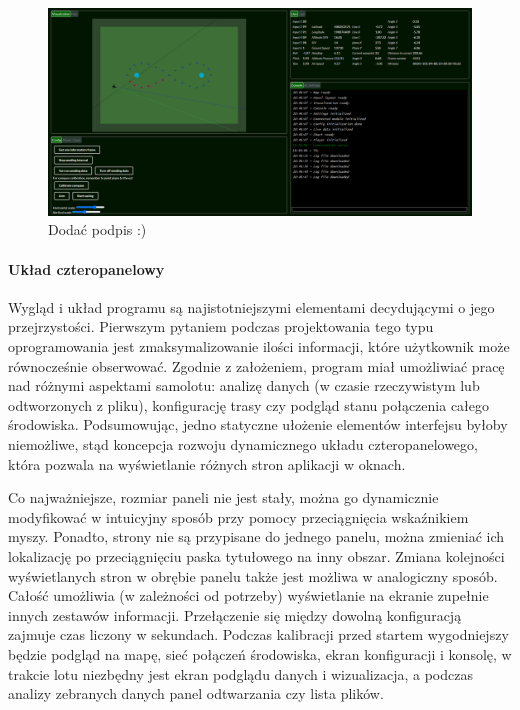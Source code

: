\documentclass[12pt, a4paper]{article}
\begin{document}
 \begin{figure}[ht]
    \centering
    \includegraphics[width=1\textwidth]{weball}
    \caption{Dodać podpis :)}
\end{figure}



\paragraph{Układ czteropanelowy}\mbox{}

Wygląd i układ programu są najistotniejszymi elementami decydującymi o jego przejrzystości. Pierwszym pytaniem podczas projektowania tego typu oprogramowania jest zmaksymalizowanie ilości informacji, które użytkownik może równocześnie obserwować. Zgodnie z założeniem, program  miał umożliwiać pracę nad różnymi aspektami samolotu: analizę danych (w czasie rzeczywistym lub odtworzonych z pliku), konfigurację trasy czy podgląd stanu połączenia całego środowiska. Podsumowując, jedno statyczne ułożenie elementów interfejsu byłoby niemożliwe, stąd koncepcja rozwoju dynamicznego układu czteropanelowego, która pozwala na wyświetlanie różnych stron aplikacji w oknach.

Co najważniejsze, rozmiar paneli nie jest stały, można go dynamicznie modyfikować w intuicyjny sposób przy pomocy przeciągnięcia wskaźnikiem myszy. Ponadto, strony nie są przypisane do jednego panelu, można zmieniać ich lokalizację po przeciągnięciu paska tytułowego na inny obszar. Zmiana kolejności wyświetlanych stron w obrębie panelu także jest możliwa w analogiczny sposób. Całość umożliwia (w zależności od potrzeby) wyświetlanie na ekranie zupełnie innych zestawów informacji. Przełączenie się między dowolną konfiguracją zajmuje czas liczony w sekundach. Podczas kalibracji przed startem wygodniejszy będzie podgląd na mapę, sieć połączeń środowiska, ekran konfiguracji i konsolę, w trakcie lotu niezbędny jest ekran podglądu danych i wizualizacja, a podczas analizy zebranych danych panel odtwarzania czy lista plików.
\end{document}
